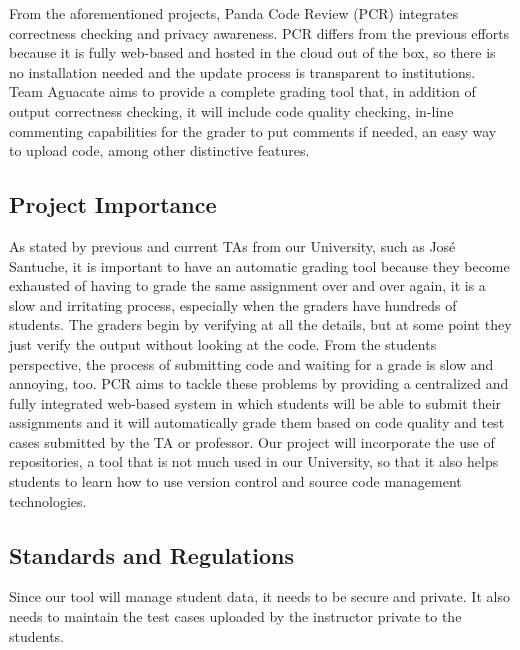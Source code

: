 From the aforementioned projects, Panda Code Review (PCR) integrates correctness
checking and privacy awareness. PCR differs from the previous efforts because it
is fully web-based and hosted in the cloud out of the box, so there is no
installation needed and the update process is transparent to institutions. Team
Aguacate aims to provide a complete grading tool that, in addition of output
correctness checking, it will include code quality checking, in-line commenting
capabilities for the grader to put comments if needed, an easy way to upload
code, among other distinctive features.

\subsection{Project Importance}

As stated by previous and current TAs from our University, such as José
Santuche, it is important to have an automatic grading tool because they become
exhausted of having to grade the same assignment over and over again, it is a
slow and irritating process, especially when the graders have hundreds of
students. The graders begin by verifying at all the details, but at some point
they just verify the output without looking at the code. From the students
perspective, the process of submitting code and waiting for a grade is slow and
annoying, too. PCR aims to tackle these problems by providing a centralized and
fully integrated web-based system in which students will be able to submit their
assignments and it will automatically grade them based on code quality and test
cases submitted by the TA or professor. Our project will incorporate the use of
repositories, a tool that is not much used in our University, so that it also
helps students to learn how to use version control and source code management
technologies.

\subsection{Standards and Regulations}

Since our tool will manage student data, it needs to be secure and private. It
also needs to maintain the test cases uploaded by the instructor private to the
students.

